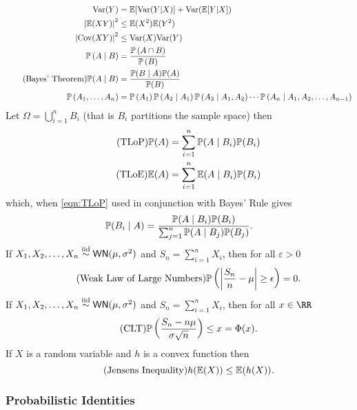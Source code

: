 \begin{align}
    \Var(Y)                               & = \Em [\Var(Y | X)]+\Var(\Em[Y | X])\vspace{-4mm}                                                                                                              \\
    \left| \Em (X Y) \right|^2            & \leq \Em (X^2) \Em (Y^2)                                                                                                                                       \\
    \left| \Cov (X Y) \right|^2           & \leq \Var (X) \Var (Y)                                                                                                                                         \\
    \Pm \left( A \mid B \right)           & = \frac{\Pm \left( A \cap B \right)}{\Pm \left( B \right)}                                                                                                     \\
    \tag{Bayes' Theorem} \Pm (A \mid B)   & = \frac{\Pm (B \mid A) \Pm (A)}{\Pm (B)}                                                                                                                       \\
    \Pm \left( A_1 , \ldots , A_n \right) & = \Pm \left( A_1 \right) \Pm \left( A_2 \mid A_1 \right) \Pm \left( A_3 \mid A_1 , A_2 \right) \cdots \Pm \left( A_n \mid A_1 , A_2 , \ldots , A_{n-1} \right) \\
\end{align}
Let $\Omega = \bigcup\limits_{i=1}^{n} B_{i}$ (that is $B_{i}$ partitions the sample space) then
\begin{align}
    \tag{TLoP} {\mathbb{P}} (A) & = \sum_{i=1}^{n} {\mathbb{P}} (A\mid B_i) {\mathbb{P}} (B_i) \label{eqn:TLoP} \\
    \tag{TLoE} {\mathbb{E}} (A) & = \sum_{i=1}^{n} {\mathbb{E}} (A\mid B_i) {\mathbb{P}} (B_i)
\end{align}
which, when \ref{eqn:TLoP} used in conjunction with Bayes' Rule gives
\begin{equation}
    {\mathbb{P}} (B_i \mid A) = \frac{{\mathbb{P}} (A\mid B_i) {\mathbb{P}} (B_i)}{\sum_{j=1}^{n} {\mathbb{P}} (A\mid B_j) {\mathbb{P}} (B_j)}.
\end{equation}
If $X_1 , X_2 , \ldots , X_n \overset{\text{iid}}{\sim} {\sf WN} (\mu,\sigma^2)$ and $S_n = \sum_{i=1}^{n} X_i$, then for all $\varepsilon > 0$
\begin{equation}
    \tag{Weak Law of Large Numbers} {\mathbb{P}} \left( \left| \frac{S_n}{n} -\mu \right| \geq \epsilon \right) = 0 .
\end{equation}
If $X_1 , X_2 , \ldots , X_n \overset{\text{iid}}{\sim} {\sf WN} (\mu,\sigma^2)$ and $S_n = \sum_{i=1}^{n} X_i$, then for all $x \in \RR$
\begin{equation}
    \tag{CLT} {\mathbb{P}} \left( \frac{S_n - n \mu}{\sigma \sqrt{n}} \right) \leq x = \Phi (x) .
\end{equation}
If $X$ is a random variable and $h$ is a convex function then
\begin{equation}
    \tag{Jensens Inequality} h({\mathbb{E}} (X)) \leq {\mathbb{E}} (h(X)).
\end{equation}

\subsubsection*{Probabilistic Identities}
